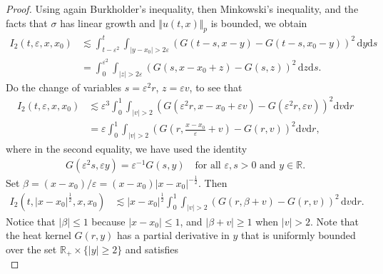 \documentclass[12pt,a4paper]{article}
\newcommand{\R}{{\mathbb{R}}}
\renewcommand{\d}{\mathrm{d}}
\newcommand {\ep}{{\varepsilon}}
\newcommand {\half}{\frac 12}
\newcommand{\<}{\langle}
\renewcommand{\>}{\rangle}
\begin{document}
\begin{proof}
Using again Burkholder's inequality, then Minkowski's inequality, and the facts that $\sigma$ has linear growth and $\Vert u(t, x) \Vert_p$ is bounded, we obtain 
\begin{align*}
           I_2(t, \varepsilon, x, x_0) %
           & \lesssim \int_{t-\varepsilon^2}^t\int_{|y-x_0|>2\varepsilon} (G(t-s, x-y)- G(t-s, x_0-y))^2\, \d y \d s\\
           &= \int_0^{\ep^2} \int_{\vert z \vert > 2 \ep} (G(s, x - x_0 + z) - G(s, z))^2\, \d z \d s. 
\end{align*}
Do the change of variables $s = \ep^2 r$, $z= \ep v$, to see that
\begin{align*}
   I_2(t, \varepsilon, x, x_0) &\lesssim  \varepsilon^3 \int^{1}_{0}\int_{|v|>2} \left(G\left(\varepsilon^2 r, x-x_0 +\varepsilon v\right)- G(\varepsilon^2 r, \varepsilon v)\right)^2 \d v \d r \\
           &=  \varepsilon \int^{1}_{0}\int_{|v|>2} \left(G\left(r, \frac{x-x_0}{\varepsilon} + v\right)- G(r, v)\right)^2 \d v \d r,
\end{align*}
where in the second equality, we have used the identity 
\begin{align}\label{eq:scale}
           G(\varepsilon^2 s, \varepsilon y)= \varepsilon^{-1} G(s, y)\quad  \text{for all $\varepsilon, s>0$ and $y\in \R$}.
\end{align}
Set $\beta = (x - x_0)/\varepsilon = (x-x_0) |x-x_0|^{-\half}$. Then 
\begin{align*}
           I_2(t, |x-x_0|^\half, x, x_0) &\lesssim   
           |x-x_0|^\half \int^{1}_{0}\int_{|v|>2} (G(r, \beta + v)- G(r, v))^2\, \d v \d r .
\end{align*}
Notice that $\vert \beta \vert \leq 1$ because $|x-x_0| \leq 1$, and $\vert \beta + v \vert \geq 1$ when $|v|>2$. Note that the heat kernel $G(r, y)$ has a partial derivative in $y$ that is uniformly bounded over the set $\R_+ \times \{\vert y\vert \geq 2 \}$ and satisfies
\begin{equation*}

\end{equation*}
\end{proof}
\end{document}

